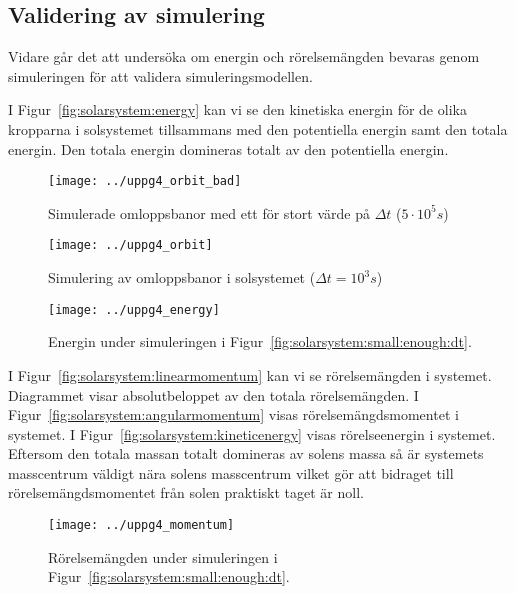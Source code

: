 \documentclass[a4]{article}
\begin{document}

		\subsection{Validering av simulering}
Vidare går det att undersöka om energin och rörelsemängden
bevaras genom simuleringen för att validera
simuleringsmodellen.

I Figur~\vref{fig:solarsystem:energy} kan vi se den kinetiska energin för de olika kropparna i solsystemet
tillsammans med den potentiella energin samt den totala energin.
Den totala energin domineras totalt av den potentiella energin.

\begin{figure}
\begin{center}
	\texttt{[image: ../uppg4\_orbit\_bad]}
\end{center}
\caption{Simulerade omloppsbanor med ett för stort värde på $\Delta t$ ($5\cdot 10^5 s$)}
\label{fig:solarsystem:large:dt}
\end{figure}

\begin{figure}
\begin{center}
	\texttt{[image: ../uppg4\_orbit]}
\end{center}
\caption{Simulering av omloppsbanor i solsystemet ($\Delta t = 10^3 s$)}
\label{fig:solarsystem:small:enough:dt}
\end{figure}

\begin{figure}
\begin{center}
	\texttt{[image: ../uppg4\_energy]}
\end{center}
\caption{Energin under simuleringen i Figur~\vref{fig:solarsystem:small:enough:dt}.}
\label{fig:solarsystem:energy}
\end{figure}

I Figur~\vref{fig:solarsystem:linearmomentum} kan vi se rörelsemängden i systemet.
Diagrammet visar absolutbeloppet av den totala rörelsemängden.
I Figur~\vref{fig:solarsystem:angularmomentum} visas rörelsemängdsmomentet i systemet.
I Figur~\vref{fig:solarsystem:kineticenergy} visas rörelseenergin i systemet.
Eftersom den totala massan totalt domineras av solens massa så är systemets
masscentrum väldigt nära solens masscentrum vilket gör att bidraget till
rörelsemängdsmomentet från solen praktiskt taget är noll.
\begin{figure}
\begin{center}
	\texttt{[image: ../uppg4\_momentum]}
\end{center}
\caption{Rörelsemängden under simuleringen i Figur~\vref{fig:solarsystem:small:enough:dt}.}
\label{fig:solarsystem:linearmomentum}
\end{figure}
\end{document}
